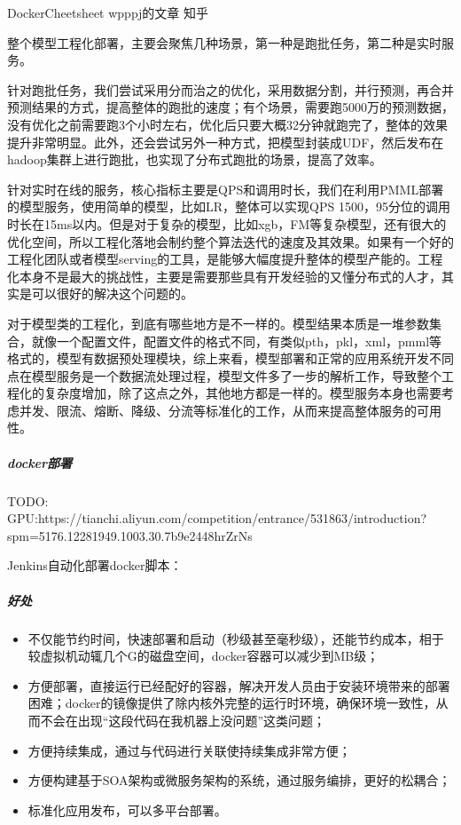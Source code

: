 \documentclass[letterpaper,11pt,english]{sphinxmanual}
\begin{document}
Docker\sphinxhyphen{}Cheet\sphinxhyphen{}sheet \sphinxhyphen{} wpppj的文章 \sphinxhyphen{} 知乎

整个模型工程化部署，主要会聚焦几种场景，第一种是跑批任务，第二种是实时服务。

针对跑批任务，我们尝试采用分而治之的优化，采用数据分割，并行预测，再合并预测结果的方式，提高整体的跑批的速度；有个场景，需要跑5000万的预测数据，没有优化之前需要跑3个小时左右，优化后只要大概32分钟就跑完了，整体的效果提升非常明显。此外，还会尝试另外一种方式，把模型封装成UDF，然后发布在hadoop集群上进行跑批，也实现了分布式跑批的场景，提高了效率。

针对实时在线的服务，核心指标主要是QPS和调用时长，我们在利用PMML部署的模型服务，使用简单的模型，比如LR，整体可以实现QPS
1500，95分位的调用时长在15ms以内。但是对于复杂的模型，比如xgb，FM等复杂模型，还有很大的优化空间，所以工程化落地会制约整个算法迭代的速度及其效果。如果有一个好的工程化团队或者模型serving的工具，是能够大幅度提升整体的模型产能的。工程化本身不是最大的挑战性，主要是需要那些具有开发经验的又懂分布式的人才，其实是可以很好的解决这个问题的。

对于模型类的工程化，到底有哪些地方是不一样的。模型结果本质是一堆参数集合，就像一个配置文件，配置文件的格式不同，有类似pth，pkl，xml，pmml等格式的，模型有数据预处理模块，综上来看，模型部署和正常的应用系统开发不同点在模型服务是一个数据流处理过程，模型文件多了一步的解析工作，导致整个工程化的复杂度增加，除了这点之外，其他地方都是一样的。模型服务本身也需要考虑并发、限流、熔断、降级、分流等标准化的工作，从而来提高整体服务的可用性。


\subparagraph{docker部署}
\label{\detokenize{chapter_AI_dive/AI_deploy:docker}}

TODO:
GPU:https://tianchi.aliyun.com/competition/entrance/531863/introduction?spm=5176.12281949.1003.30.7b9e2448hrZrNs

Jenkins自动化部署docker脚本：


\subparagraph{好处}
\label{\detokenize{chapter_AI_dive/AI_deploy:id2}}\begin{itemize}
\item {} 
不仅能节约时间，快速部署和启动（秒级甚至毫秒级），还能节约成本，相于较虚拟机动辄几个G的磁盘空间，docker容器可以减少到MB级；

\item {} 
方便部署，直接运行已经配好的容器，解决开发人员由于安装环境带来的部署困难；docker的镜像提供了除内核外完整的运行时环境，确保环境一致性，从而不会在出现“这段代码在我机器上没问题”这类问题；

\item {} 
方便持续集成，通过与代码进行关联使持续集成非常方便；

\item {} 
方便构建基于SOA架构或微服务架构的系统，通过服务编排，更好的松耦合；

\item {} 
标准化应用发布，可以多平台部署。

\end{itemize}
\end{document}
